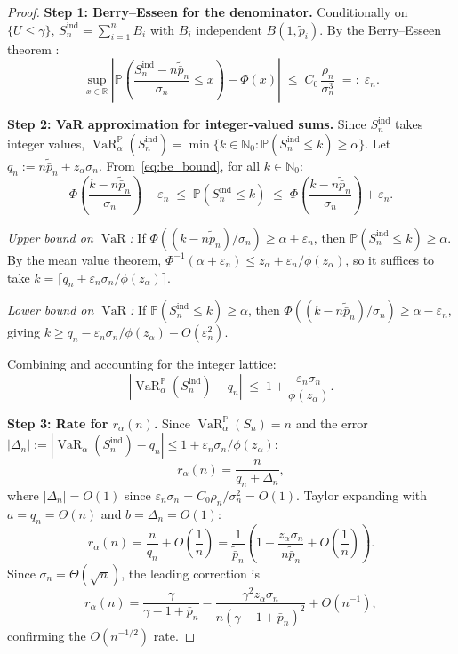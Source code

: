 \documentclass[11pt]{article}
\theoremstyle{definition}
\newcommand{\R}{\mathbb{R}}
\newcommand{\N}{\mathbb{N}}
\newcommand{\VaR}{\operatorname{VaR}}
\newcommand{\PP}{\mathbb{P}}
\newcommand{\1}{\mathbf{1}}
\begin{document}
\begin{proof}
\textbf{Step 1: Berry--Esseen for the denominator.} Conditionally on $\{U \leq \gamma\}$, $S_n^{\mathrm{ind}} = \sum_{i=1}^n B_i$ with $B_i$ independent $B(1, \tilde{p}_i)$. By the Berry--Esseen theorem \citep{Berry1941, Esseen1942}:
\begin{equation}\label{eq:be_bound}
  \sup_{x \in \R}\left|\PP\!\left(\frac{S_n^{\mathrm{ind}} - n\tilde{\bar{p}}_n}{\sigma_n} \leq x\right) - \Phi(x)\right|
  \;\leq\; C_0\,\frac{\rho_n}{\sigma_n^3} \;=:\; \varepsilon_n.
\end{equation}

\textbf{Step 2: VaR approximation for integer-valued sums.} Since $S_n^{\mathrm{ind}}$ takes integer values, $\VaR_\alpha^\PP(S_n^{\mathrm{ind}}) = \min\{k \in \N_0 : \PP(S_n^{\mathrm{ind}} \leq k) \geq \alpha\}$. Let $q_n := n\tilde{\bar{p}}_n + z_\alpha \sigma_n$. From~\eqref{eq:be_bound}, for all $k \in \N_0$:
\[
  \Phi\!\left(\frac{k - n\tilde{\bar{p}}_n}{\sigma_n}\right) - \varepsilon_n
  \;\leq\; \PP(S_n^{\mathrm{ind}} \leq k)
  \;\leq\; \Phi\!\left(\frac{k - n\tilde{\bar{p}}_n}{\sigma_n}\right) + \varepsilon_n.
\]

\emph{Upper bound on $\VaR$:} If $\Phi((k - n\tilde{\bar{p}}_n)/\sigma_n) \geq \alpha + \varepsilon_n$, then $\PP(S_n^{\mathrm{ind}} \leq k) \geq \alpha$. By the mean value theorem, $\Phi^{-1}(\alpha + \varepsilon_n) \leq z_\alpha + \varepsilon_n/\phi(z_\alpha)$, so it suffices to take $k = \lceil q_n + \varepsilon_n\sigma_n/\phi(z_\alpha) \rceil$.

\emph{Lower bound on $\VaR$:} If $\PP(S_n^{\mathrm{ind}} \leq k) \geq \alpha$, then $\Phi((k - n\tilde{\bar{p}}_n)/\sigma_n) \geq \alpha - \varepsilon_n$, giving $k \geq q_n - \varepsilon_n\sigma_n/\phi(z_\alpha) - O(\varepsilon_n^2)$.

Combining and accounting for the integer lattice:
\begin{equation}\label{eq:var_approx}
  \left|\VaR_\alpha^\PP(S_n^{\mathrm{ind}}) - q_n\right|
  \;\leq\; 1 + \frac{\varepsilon_n \sigma_n}{\phi(z_\alpha)}.
\end{equation}

\textbf{Step 3: Rate for $r_\alpha(n)$.} Since $\VaR_\alpha^\PP(S_n) = n$ and the error $|\Delta_n| := |\VaR_\alpha(S_n^{\mathrm{ind}}) - q_n| \leq 1 + \varepsilon_n\sigma_n/\phi(z_\alpha)$:
\[
  r_\alpha(n) = \frac{n}{q_n + \Delta_n},
\]
where $|\Delta_n| = O(1)$ since $\varepsilon_n\sigma_n = C_0\rho_n/\sigma_n^2 = O(1)$. Taylor expanding with $a = q_n = \Theta(n)$ and $b = \Delta_n = O(1)$:
\[
  r_\alpha(n) = \frac{n}{q_n} + O\!\left(\frac{1}{n}\right)
  = \frac{1}{\tilde{\bar{p}}_n}\left(1 - \frac{z_\alpha\sigma_n}{n\tilde{\bar{p}}_n} + O\!\left(\frac{1}{n}\right)\right).
\]
Since $\sigma_n = \Theta(\sqrt{n})$, the leading correction is
\begin{equation}\label{eq:leading_correction}
  r_\alpha(n) = \frac{\gamma}{\gamma - 1 + \bar{p}_n} - \frac{\gamma^2 z_\alpha \sigma_n}{n(\gamma - 1 + \bar{p}_n)^2} + O(n^{-1}),
\end{equation}
confirming the $O(n^{-1/2})$ rate.


\end{proof}
\end{document}
